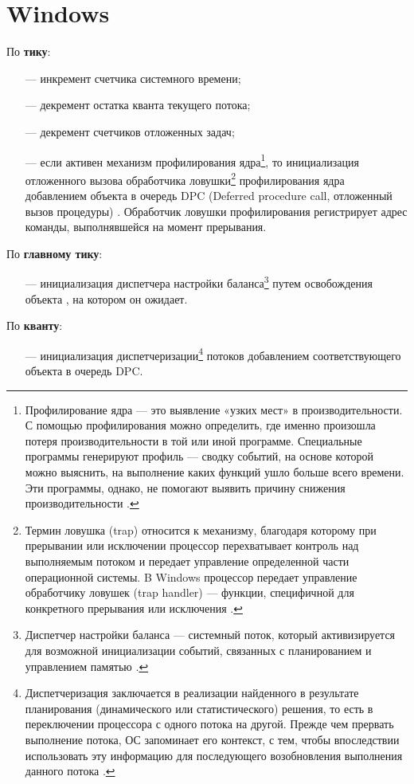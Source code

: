 
\newpage

\section{Windows}

По \textbf{тику}:

\begin{itemize}
    \item[---] инкремент счетчика системного времени;
    \item[---] декремент остатка кванта текущего потока;
    \item[---] декремент счетчиков отложенных задач;
    \item[---] если активен механизм профилирования ядра\footnote{Профилирование ядра --- это выявление «узких мест» в производительности. С помощью профилирования можно определить, где именно произошла потеря производительности в той или иной программе. Специальные программы генерируют профиль --- сводку событий, на основе которой можно выяснить, на выполнение каких функций ушло больше всего времени. Эти программы, однако, не помогают выявить причину снижения производительности \cite{prof}.}, то инициализация отложенного вызова обработчика ловушки\footnote{Термин ловушка (trap) относится к механизму, благодаря которому при прерывании или исключении процессор перехватывает контроль над выполняемым потоком и передает управление определенной части операционной системы. B Windows процессор передает управление обработчику ловушек (trap handler) — функции, специфичной для конкретного прерывания или исключения \cite{win2}.} профилирования ядра добавлением объекта в очередь DPC (Deferred procedure call, отложенный вызов процедуры) \cite{win1}. Обработчик ловушки профилирования регистрирует адрес команды, выполнявшейся на момент прерывания.
\end{itemize}

По \textbf{главному тику}:

\begin{itemize}
    \item[---] инициализация диспетчера настройки баланса\footnote{Диспетчер настройки баланса --- системный поток, который активизируется для возможной инициализации событий, связанных с планированием и управлением памятью \cite{win3}.} путем освобождения объекта \guillemotright, на котором он ожидает. 
\end{itemize}

По \textbf{кванту}:

\begin{itemize}
    \item[---] инициализация диспетчеризации\footnote{Диспетчеризация заключается в реализации найденного в результате планирования (динамического или статистического) решения, то есть в переключении процессора с одного потока на другой. Прежде чем прервать выполнение потока, ОС запоминает его контекст, с тем, чтобы впоследствии использовать эту информацию для последующего возобновления выполнения данного потока \cite{disp}.} потоков добавлением соответствующего объекта в очередь DPC.
\end{itemize}